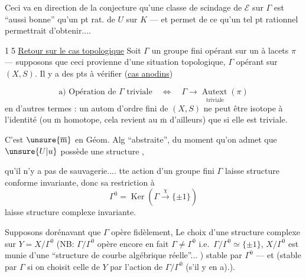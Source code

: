 
Ceci va en direction de la conjecture qu'une classe de scindage de $\mathcal E$ sur $\Gamma$ est ``aussi bonne'' qu'un pt rat. de $U$ sur $K$ --- et permet de  ce qu'un tel pt rationnel permettrait d'obtenir....

\textcircled{15} \uline{Retour sur le cas topologique} Soit $\Gamma$ un groupe fini opérant sur un  à lacets $\pi$ --- supposons que ceci provienne d'une situation topologique, $\Gamma$ opérant sur $(X,S)$. Il y a des pts à vérifier (\uline{cas anodins})

\[
\text{a) Opération de }\Gamma\text{ triviale}
\quad\Longleftrightarrow\quad
\underset{\text{triviale}}{\Gamma\longrightarrow\operatorname{Autext}(\pi)}
\]
en d'autres termes : un autom d'ordre fini de $(X,S)$ ne peut être isotope à l'identité (ou $\overline{\mathrm m}$  homotope, cela revient au $\overline{\mathrm m}$ d'ailleurs) que si elle est triviale.

C'est $\unsure{\overline{\mathrm m}}$  en Géom. Alg ``abstraite'', du moment qu'on admet que $\unsure{U|u}$ possède une structure  ,  


   qu'il n'y a pas de sauvagerie....  tte action d'un groupe fini $\Gamma$ laisse structure conforme invariante,  donc sa restriction à
\[
\Gamma^0=\operatorname{Ker}(\Gamma\xrightarrow{\chi}\{\pm1\})
\]
laisse structure complexe invariante.

Supposons dorénavant que $\Gamma$ opère fidèlement,   Le choix d'une structure complexe sur $Y=X/\Gamma^0$  (NB:  $\Gamma/\Gamma^0$ opère encore  en fait   $\Gamma\ne\Gamma^0$ i.e.\ $\Gamma/\Gamma^0\simeq\{\pm1\}$, $X/\Gamma^0$ est munie d'une ``structure de  courbe algébrique  réelle''... ) stable par $\Gamma^0$ --- et (stable par $\Gamma$ si on choisit celle de $Y$   par l'action  de $\Gamma/\Gamma^0$ (s'il y en a).).

